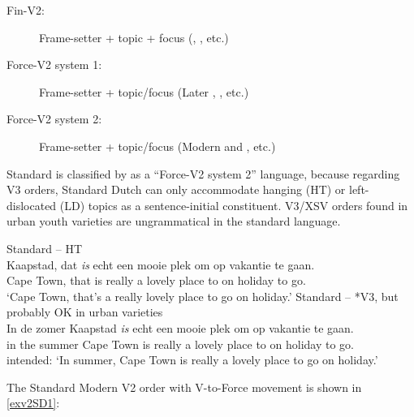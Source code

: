 \documentclass[output=paper]{langsci/langscibook}
\begin{document}
\begin{description}

    \item[Fin-V2:] Frame-setter + topic + focus (,
        , etc.)

    \item[Force-V2 system 1:] Frame-setter + topic/focus (Later
        , , etc.)

    \item[Force-V2 system 2:] Frame-setter + topic/focus 
                              (Modern  and , etc.)

\end{description}

\noindent Standard  is classified by \citet{Wolfe:2017} as a
\enquote{Force-V2 system 2} language, because regarding V3 orders, Standard
Dutch can only accommodate hanging (\gls{HT}) or
left-dislocated
(\gls{LD}) topics as a sentence-initial constituent.
V3/XSV orders found in urban youth varieties are ungrammatical in the standard
language.

\ea
    \ea\label{exdisV3-ht} Standard  -- HT\\
    \gll\label{exHT-NWa}Kaapstad, dat \textit{is} echt een mooie plek om op vakantie te gaan.\\
    {Cape Town}, that is really a lovely place to on holiday to go.\Inf{}\\
    \trans \enquote*{Cape Town, that's a really lovely place to go on holiday.}
    \ex Standard  -- *V3, but probably OK in urban varieties\\
    \gll \llap{*}In de zomer Kaapstad \textit{is} echt een mooie plek om op vakantie te gaan.\\
    in the summer {Cape Town} is really a lovely place to on holiday to go.\Inf{}\\
    \trans intended: \enquote*{In summer, Cape Town is really a lovely place to go on holiday.}\label{exHT-NW2}
    \z
\z

\noindent The Standard Modern  V2 order with
V-to-Force movement is shown in \eqref{exv2SD1}:
\end{document}
